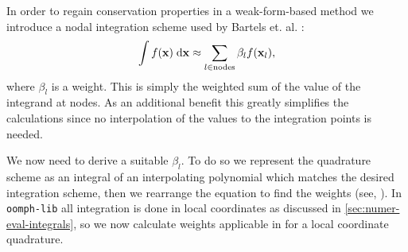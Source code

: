 In order to regain conservation properties in a weak-form-based method we introduce a nodal integration scheme used by Bartels et. al. \cite{Bartels2006}:
\begin{equation}
  \label{eq:nodal-integration}
  \int f(\mathbf{x}) {\; \mathrm{{d}}} \mathbf{x} \approx \sum_{l\in \text{nodes}} \beta_l f(\mathbf{x}_l),
\end{equation}
where $\beta_l$ is a weight.
This is simply the weighted sum of the value of the integrand at nodes.
As an additional benefit this greatly simplifies the calculations since no interpolation of the values to the integration points is needed.


We now need to derive a suitable $\beta_l$.
To do so we represent the quadrature scheme as an integral of an interpolating polynomial which matches the desired integration scheme, then we rearrange the equation to find the weights (see, \eg \cite[480]{Kincaid2002}).
In \texttt{oomph-lib} all integration is done in local coordinates as discussed in \cref{sec:numer-eval-integrals}, so we now calculate weights applicable in for a local coordinate quadrature.

